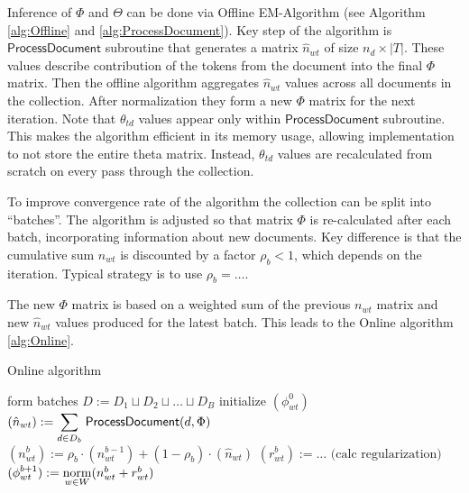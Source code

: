 \documentclass[russian,english]{llncs}
\newcommand{\norm}{\mathop{\rm norm}\limits}
\newcommand{\kw}[1]{\textsf{#1}}
\begin{document}
Inference of $\Phi$ and $\Theta$ can be done via Offline EM-Algorithm
(see Algorithm \ref{alg:Offline} and \ref{alg:ProcessDocument}).
Key step of the algorithm is $\kw{ProcessDocument}$ subroutine
that generates a matrix $\hat n_{wt}$ of size $n_d \times |T|$.
These values describe contribution of the tokens from the document into the final $\Phi$ matrix.
Then the offline algorithm aggregates $\hat n_{wt}$ values across all documents in the collection.
After normalization they form a new $\Phi$ matrix for the next iteration.
Note that $\theta_{td}$ values appear only within $\kw{ProcessDocument}$ subroutine.
This makes the algorithm efficient in its memory usage,
allowing implementation to not store the entire theta matrix.
Instead, $\theta_{td}$ values are recalculated from scratch on every pass through the collection.

To improve convergence rate of the algorithm 
the collection can be split into ``batches''.
The algorithm is adjusted so that
matrix $\Phi$
is re-calculated after each batch, incorporating information about new documents.
Key difference is that the cumulative sum $n_{wt}$ is discounted by a factor $\rho_b < 1$,
which depends on the iteration. Typical strategy is to use $\rho_b = \dots$.

The new $\Phi$ matrix is based on a weighted sum of the previous $n_{wt}$ matrix
and new $\hat n_{wt}$ values produced for the latest batch.
This leads to the Online algorithm \ref{alg:Online}.



\SetAlgoSkip{}
\begin{algorithm2e}[h]
\caption{Online algorithm} %
\label{alg:Online}
\BlankLine
{}
\BlankLine
form batches $D := D_1 \sqcup D_2 \sqcup \dots \sqcup D_B$\;
initialize $(\phi^0_{wt})$\;
 {
    $(\hat n_{wt}) := \mathlarger\sum\limits_{d \in D_b} \; \kw{ProcessDocument}(d, \Phi)$\;
    $(n^b_{wt}) := \rho_b \cdot (n^{b-1}_{wt}) + (1 - \rho_b) \cdot (\hat n_{wt})$\;
    $(r^b_{wt}) := \dots \text{ (calc regularization)}$\;
    $(\phi^{b+1}_{wt}) := \norm_{w \in W} (n^b_{wt} + r^b_{wt})$\;
}
\end{algorithm2e}
\end{document}
